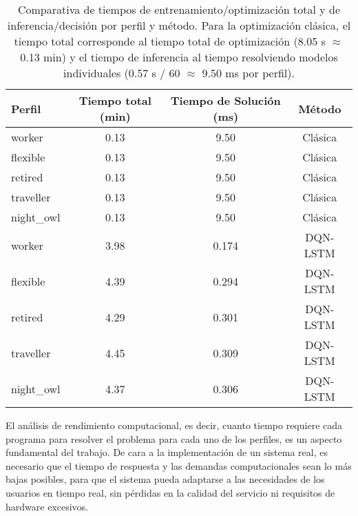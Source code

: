 \begin{table}[H]
    \centering
    \begin{tabular}{lccc}
        \toprule
        \textbf{Perfil} & \textbf{Tiempo total (min)} & \textbf{Tiempo de Solución (ms)} & \textbf{Método} \\
        \midrule
        worker      & 0.13\footnotemark[1] & 9.50\footnotemark[2] & Clásica \\
        flexible    & 0.13\footnotemark[1] & 9.50\footnotemark[2] & Clásica \\
        retired     & 0.13\footnotemark[1] & 9.50\footnotemark[2] & Clásica \\
        traveller   & 0.13\footnotemark[1] & 9.50\footnotemark[2] & Clásica \\
        night\_owl  & 0.13\footnotemark[1] & 9.50\footnotemark[2] & Clásica \\
        \midrule
        worker      & 3.98 & 0.174 & DQN-LSTM \\
        flexible    & 4.39 & 0.294 & DQN-LSTM \\
        retired     & 4.29 & 0.301 & DQN-LSTM \\
        traveller   & 4.45 & 0.309 & DQN-LSTM \\
        night\_owl  & 4.37 & 0.306 & DQN-LSTM \\
        \bottomrule
    \end{tabular}
    \caption{Comparativa de tiempos de entrenamiento/optimización total y de inferencia/decisión 
    por perfil y método. Para la optimización clásica, el tiempo total corresponde al tiempo total 
    de optimización (8.05 s $\approx$ 0.13 min) y el tiempo de inferencia al tiempo resolviendo 
    modelos individuales (0.57 s / 60 $\approx$ 9.50 ms por perfil).}
\end{table}


El análisis de rendimiento computacional, es decir, cuanto tiempo requiere cada programa para 
resolver el problema para cada uno de los perfiles, es un aspecto fundamental del trabajo. De cara 
a la implementación de un sistema real, es necesario que el tiempo de respuesta y las demandas 
computacionales sean lo más bajas posibles, para que el sistema pueda adaptarse a las
necesidades de los usuarios en tiempo real, sin pérdidas en la calidad del servicio ni requisitos 
de hardware excesivos.\\

